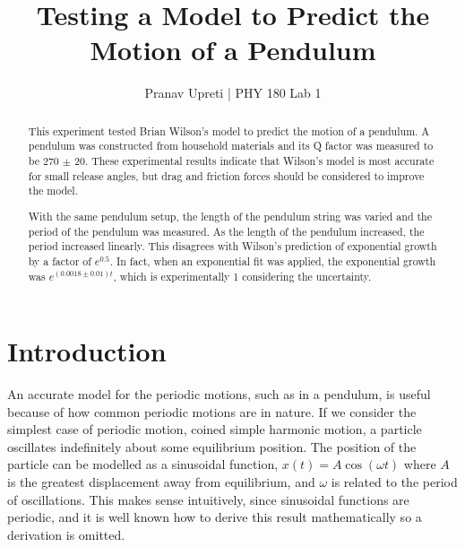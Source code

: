 \documentclass[notitlepage,twocolumn, 12pt]{report}
\title{Testing a Model to Predict the Motion of a Pendulum} %
\author{Pranav Upreti | PHY 180 Lab 1}
\begin{document}
    \maketitle
    \setcounter{page}{1}
    \begin{abstract}
    This experiment tested Brian Wilson's model to predict the motion of a pendulum. A pendulum was constructed from household materials and its Q factor was measured to be 270 $\pm$ 20. These experimental results indicate that Wilson's model is most accurate for small release angles, but drag and friction forces should be considered to improve the model. 

    With the same pendulum setup, the length of the pendulum string was varied and the period of the pendulum was measured. As the length of the pendulum increased, the period increased linearly. This disagrees with Wilson's prediction of exponential growth by a factor of $e^{0.5}$. In fact, when an exponential fit was applied, the exponential growth was $e^{(0.0018 \pm 0.01)t}$, which is experimentally 1 considering the uncertainty. 
    \end{abstract}
    \section{Introduction}
    An accurate model for the periodic motions, such as in a pendulum, is useful because of how common periodic motions are in nature. If we consider the simplest case of periodic motion, coined simple harmonic motion, a particle oscillates indefinitely about some equilibrium position. The position of the particle can be modelled as a sinusoidal function, $x(t) = A\cos(\omega t)$ where $A$ is the greatest displacement away from equilibrium, and $\omega$ is related to the period of oscillations. This makes sense intuitively, since sinusoidal functions are periodic, and it is well known how to derive this result mathematically so a derivation is omitted. 
\end{document}
